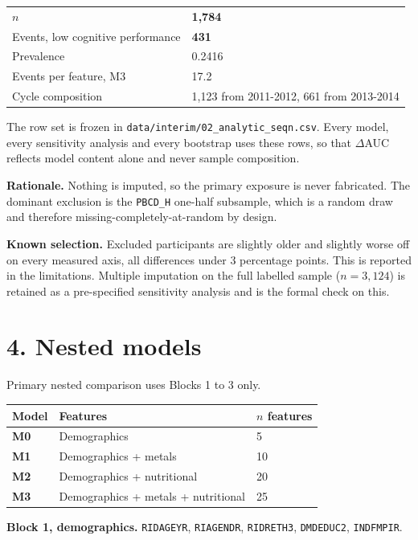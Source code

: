 \documentclass[11pt]{article}
\begin{document}
\begin{longtable}{L{7cm}L{6cm}}
\toprule
& \\
\midrule
\endhead
$n$ & \textbf{1,784} \\
Events, low cognitive performance & \textbf{431} \\
Prevalence & 0.2416 \\
Events per feature, M3 & 17.2 \\
Cycle composition & 1,123 from 2011-2012, 661 from 2013-2014 \\
\bottomrule
\end{longtable}

The row set is frozen in \texttt{data/interim/02\_analytic\_seqn.csv}. Every model, every sensitivity analysis and every bootstrap uses these rows, so that $\Delta$AUC reflects model content alone and never sample composition.

\textbf{Rationale.} Nothing is imputed, so the primary exposure is never fabricated. The dominant exclusion is the \texttt{PBCD\_H} one-half subsample, which is a random draw and therefore missing-completely-at-random by design.

\textbf{Known selection.} Excluded participants are slightly older and slightly worse off on every measured axis, all differences under 3 percentage points. This is reported in the limitations. Multiple imputation on the full labelled sample ($n = 3{,}124$) is retained as a pre-specified sensitivity analysis and is the formal check on this.

\section*{4. Nested models}

Primary nested comparison uses Blocks 1 to 3 only.

\begin{longtable}{L{3cm}L{7.5cm}L{2.5cm}}
\toprule
Model & Features & $n$ features \\
\midrule
\endhead
\textbf{M0} & Demographics & 5 \\
\textbf{M1} & Demographics + metals & 10 \\
\textbf{M2} & Demographics + nutritional & 20 \\
\textbf{M3} & Demographics + metals + nutritional & 25 \\
\bottomrule
\end{longtable}

\textbf{Block 1, demographics.} \texttt{RIDAGEYR}, \texttt{RIAGENDR}, \texttt{RIDRETH3}, \texttt{DMDEDUC2}, \texttt{INDFMPIR}.
\end{document}
